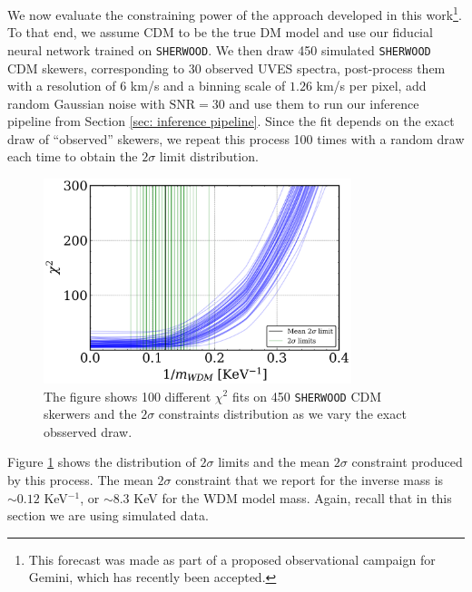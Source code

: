 We now evaluate the constraining power of the approach developed in this work\footnote{This forecast was made as part of a proposed observational campaign for Gemini, which has recently been accepted.}. To that end, we assume CDM to be the true DM model and use our fiducial neural network trained on \texttt{SHERWOOD}. We then draw 450 simulated \texttt{SHERWOOD} CDM skewers, corresponding to 30 observed UVES spectra, post-process them with a resolution of 6 km/s and a binning scale of $1.26$ km/s per pixel, add random Gaussian noise with $\text{SNR}=30$ and use them to run our inference pipeline from Section \ref{sec: inference pipeline}. Since the fit depends on the exact draw of ``observed'' skewers, we repeat this process 100 times with a random draw each time to obtain the $2\sigma$ limit distribution.

\begin{figure}
    \centering
    \includegraphics[width=0.8\textwidth]{img/ML/inference_cdm_sherwood.png}
    \caption{The figure shows 100 different $\chi^2$ fits on 450 \texttt{SHERWOOD} CDM skerwers and the $2\sigma$ constraints distribution as we vary the exact obsserved draw.}
    \label{fig: inference cdm sherwood}
\end{figure}
Figure \ref{fig: inference cdm sherwood} shows the distribution of $2\sigma$ limits and the mean $2\sigma$ constraint produced by this process. The mean $2\sigma$ constraint that we report for the inverse mass is $\sim 0.12$ KeV$^{-1}$, or $\sim 8.3$ KeV for the WDM model mass. Again, recall that in this section we are using simulated data.

